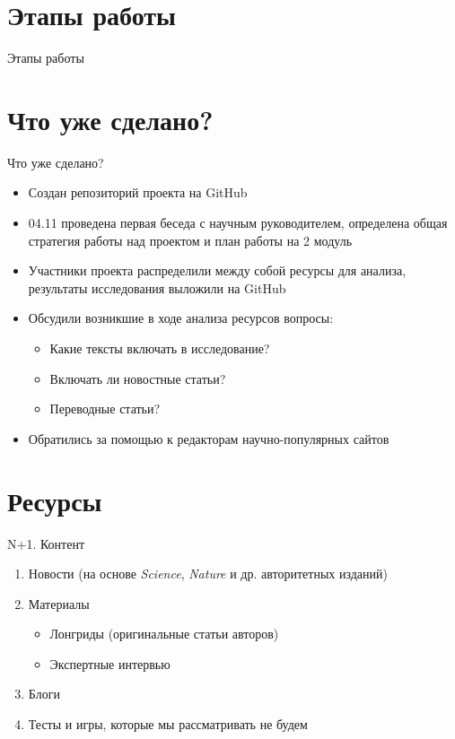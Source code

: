\documentclass{beamer}
\begin{document}
\section{Этапы работы}

\begin{frame}{Этапы работы}




\end{frame}

\section{Что уже сделано?}
\begin{frame}{Что уже сделано?}
\begin{itemize}
\item Создан репозиторий проекта на GitHub
\item 04.11 проведена первая беседа с научным руководителем, определена общая стратегия работы над проектом и план работы на 2 модуль
\item Участники проекта распределили между собой ресурсы для анализа, результаты исследования выложили на GitHub
\item Обсудили возникшие в ходе анализа ресурсов вопросы:
	\begin{itemize}
	\item Какие  тексты включать в исследование?
    \item Включать ли новостные статьи?
    \item Переводные статьи?
	\end{itemize}
\item Обратились за помощью к редакторам научно-популярных сайтов
\end{itemize}
\end{frame}


\section{Ресурсы}
\begin{frame}{N+1. Контент}
   \begin{enumerate}
   \item Новости (на основе \textit{Science}, \textit{Nature} и др. авторитетных изданий)
   \item Материалы
   		\begin{itemize}
   		\item Лонгриды (оригинальные статьи авторов)
        \item Экспертные интервью
   		\end{itemize}
    \item Блоги
    \item Тесты и игры, которые мы рассматривать не будем
   \end{enumerate}

\end{frame}
\end{document}
